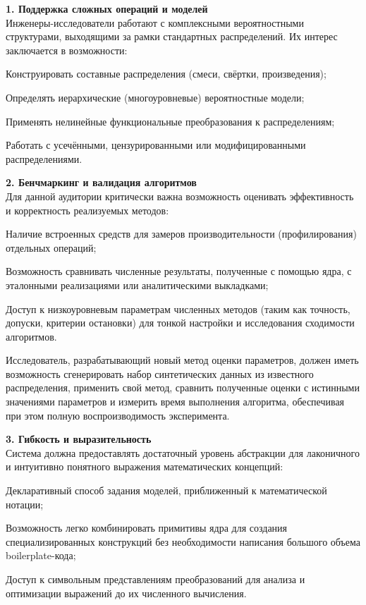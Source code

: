 \textbf{1. Поддержка сложных операций и моделей} \\
Инженеры-исследователи работают с комплексными вероятностными структурами, выходящими за рамки стандартных распределений. Их интерес заключается в возможности:
\begin{itemizecmp}
    \item Конструировать составные распределения (смеси, свёртки, произведения);
    \item Определять иерархические (многоуровневые) вероятностные модели;
    \item Применять нелинейные функциональные преобразования к распределениям;
    \item Работать с усечёнными, цензурированными или модифицированными распределениями.
\end{itemizecmp}

\textbf{2. Бенчмаркинг и валидация алгоритмов} \\
Для данной аудитории критически важна возможность оценивать эффективность и корректность реализуемых методов:
\begin{itemizecmp}
    \item Наличие встроенных средств для замеров производительности (профилирования) отдельных операций;
    \item Возможность сравнивать численные результаты, полученные с помощью ядра, с эталонными реализациями или аналитическими выкладками;
    \item Доступ к низкоуровневым параметрам численных методов (таким как точность, допуски, критерии остановки) для тонкой настройки и исследования сходимости алгоритмов.
\end{itemizecmp}

\begin{example}
Исследователь, разрабатывающий новый метод оценки параметров, должен иметь возможность сгенерировать набор синтетических данных из известного распределения, применить свой метод, сравнить полученные оценки с истинными значениями параметров и измерить время выполнения алгоритма, обеспечивая при этом полную воспроизводимость эксперимента.
\end{example}

\textbf{3. Гибкость и выразительность} \\
Система должна предоставлять достаточный уровень абстракции для лаконичного и интуитивно понятного выражения математических концепций:
\begin{itemizecmp}
    \item Декларативный способ задания моделей, приближенный к математической нотации;
    \item Возможность легко комбинировать примитивы ядра для создания специализированных конструкций без необходимости написания большого объема boilerplate-кода;
    \item Доступ к символьным представлениям преобразований для анализа и оптимизации выражений до их численного вычисления.
\end{itemizecmp}

